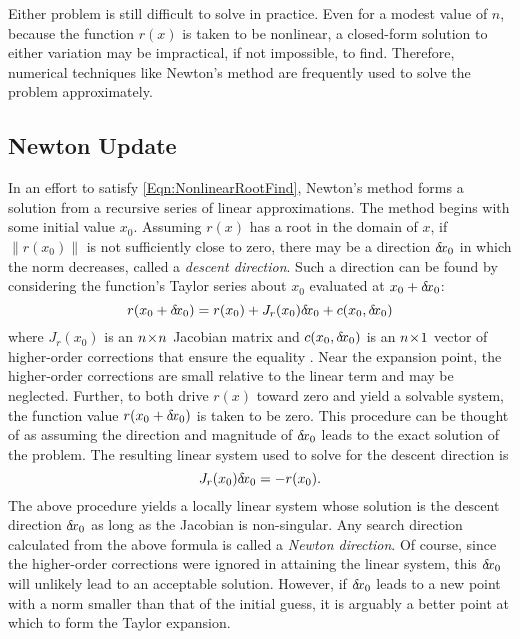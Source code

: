 \documentclass[12pt]{UWMadThesis}
\begin{document}
Either problem is still difficult to solve in practice.
Even for a modest value of $n$, because the function $r(x)$ is taken to be nonlinear, a closed-form solution to either variation may be impractical, if not impossible, to find.
Therefore, numerical techniques like Newton's method are frequently used to solve the problem approximately.





\subsection{Newton Update}
In an effort to satisfy \cref{Eqn:NonlinearRootFind}, Newton's method forms a solution from a recursive series of linear approximations.
The method begins with some initial value $x_0$.
Assuming $r(x)$ has a root in the domain of $x$, if $\|r(x_0)\|$ is not sufficiently close to zero, there may be a direction $\delta \mkern-3.00mu x_0$ in which the norm decreases, called a \textit{descent direction}.
Such a direction can be found by considering the function's Taylor series about $x_0$ evaluated at $x_0 + \delta \mkern-3.00mu x_0$:
\begin{equation}
    r(x_0 + \delta \mkern-3.00mu x_0) =  r(x_0) + J_r(x_0)\delta \mkern-3.00mu x_0 + c(x_0,\delta \mkern-3.00mu x_0)
\end{equation}
where $J_r(x_0)$ is an $n \!\times\! n$ Jacobian matrix and $c(x_0,\delta \mkern-3.00mu x_0)$ is an $n \!\times\! 1$ vector of higher-order corrections that ensure the equality \cite{eriksson_applied_2003}.
Near the expansion point, the higher-order corrections are small relative to the linear term and may be neglected.
Further, to both drive $r(x)$ toward zero and yield a solvable system, the function value $r(x_0 + \delta \mkern-3.00mu x_0)$ is taken to be zero.
This procedure can be thought of as assuming the direction and magnitude of $\delta \mkern-3.00mu x_0$ leads to the exact solution of the problem.
The resulting linear system used to solve for the descent direction is
\begin{equation}
    J_{r}(x_0) \delta \mkern-3.00mu x_0 = -r(x_0).
    \label{Eqn:NewtonsDirection}
\end{equation}
The above procedure yields a locally linear system whose solution is the descent direction $\delta \mkern-3.00mu x_0$ as long as the Jacobian is non-singular.
Any search direction calculated from the above formula is called a \textit{Newton direction}.
Of course, since the higher-order corrections were ignored in attaining the linear system, this $\delta \mkern-3.00mu x_0$ will unlikely lead to an acceptable solution.
However, if $\delta \mkern-3.00mu x_0$ leads to a new point with a norm smaller than that of the initial guess, it is arguably a better point at which to form the Taylor expansion.
\end{document}
